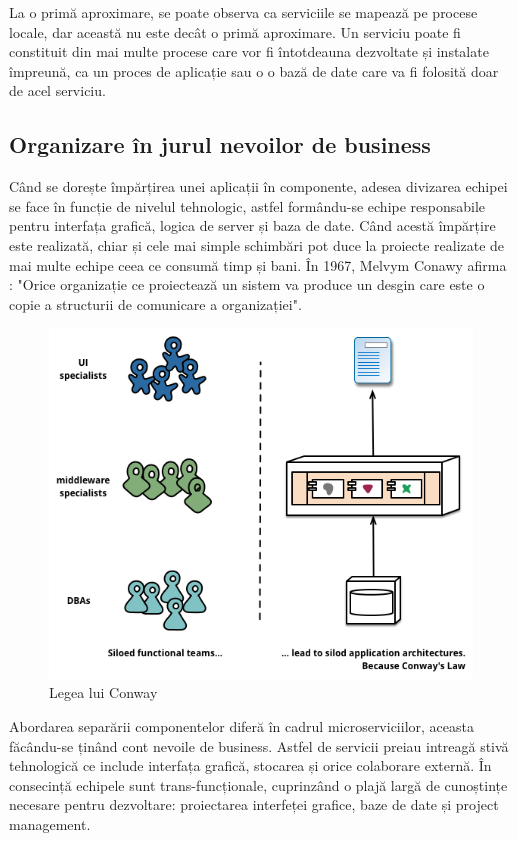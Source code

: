\documentclass[12pt, a4paper, oneside, romanian]{teza-upb}
\begin{document}
La o primă aproximare, se poate observa ca serviciile se mapează pe procese locale, dar această nu este decât o primă aproximare. Un serviciu poate fi constituit din mai multe procese care vor fi întotdeauna dezvoltate și instalate împreună, ca un proces de aplicație sau o o bază de date care va fi folosită doar de acel serviciu.

\subsection{Organizare în jurul nevoilor de business}

Când se dorește împărțirea unei aplicații în componente, adesea divizarea echipei se face în funcție de nivelul tehnologic, astfel formându-se echipe responsabile pentru interfața grafică, logica de server și baza de date. Când acestă împărțire este realizată, chiar și cele mai simple schimbări pot duce la proiecte realizate de mai multe echipe ceea ce consumă timp și bani. În 1967, Melvym Conawy afirma : "Orice organizație ce proiectează un sistem va produce un desgin care este o copie a structurii de comunicare a organizației".

\begin{figure}[ht]
\centering
\includegraphics[scale=0.5]{img/conways-law.png}
\caption{Legea lui Conway}
\label{fig:legea_lui_conway}
\end{figure}

Abordarea separării componentelor diferă în cadrul microserviciilor, aceasta făcându-se ținând cont nevoile de business. Astfel de servicii preiau intreagă stivă tehnologică ce include interfața grafică, stocarea și orice colaborare externă. În consecință echipele sunt trans-funcționale, cuprinzând o plajă largă de cunoștințe necesare pentru dezvoltare: proiectarea interfeței grafice, baze de date și project management. 
\end{document}
